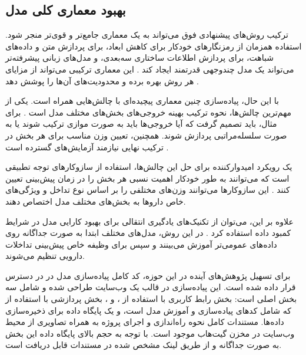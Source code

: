 \subsection{بهبود معماری کلی مدل}

ترکیب روش‌های پیشنهادی فوق می‌تواند به یک معماری جامع‌تر و قوی‌تر منجر شود. استفاده همزمان از رمزنگارهای خودکار برای کاهش ابعاد،  برای پردازش متن و داده‌های شباهت،  برای پردازش اطلاعات ساختاری سه‌بعدی، و مدل‌های زبانی پیشرفته‌تر می‌تواند یک مدل چندوجهی قدرتمند ایجاد کند \cite{ref_shi2024}. این معماری ترکیبی می‌تواند از مزایای هر روش بهره برده و محدودیت‌های آن‌ها را پوشش دهد \cite{ref_he2023}.

با این حال، پیاده‌سازی چنین معماری پیچیده‌ای با چالش‌هایی همراه است. یکی از مهم‌ترین چالش‌ها، نحوه ترکیب بهینه خروجی‌های بخش‌های مختلف مدل است \cite{ref_dai2020}. برای مثال، باید تصمیم گرفت که آیا خروجی‌ها باید به صورت موازی ترکیب شوند یا به صورت سلسله‌مراتبی پردازش شوند. همچنین، تعیین وزن مناسب برای هر بخش در ترکیب نهایی نیازمند آزمایش‌های گسترده است \cite{ref_yang2022}.

یک رویکرد امیدوارکننده برای حل این چالش‌ها، استفاده از سازوکار‌های توجه تطبیقی است که می‌توانند به طور خودکار اهمیت نسبی هر بخش را در زمان پیش‌بینی تعیین کنند \cite{ref_lin2022}. این سازوکار‌ها می‌توانند وزن‌های مختلفی را بر اساس نوع تداخل و ویژگی‌های خاص داروها به بخش‌های مختلف مدل اختصاص دهند.

علاوه بر این، می‌توان از تکنیک‌های یادگیری انتقالی برای بهبود کارایی مدل در شرایط کمبود داده استفاده کرد \cite{ref_deng2022}. در این روش، مدل‌های مختلف ابتدا به صورت جداگانه روی داده‌های عمومی‌تر آموزش می‌بینند و سپس برای وظیفه خاص پیش‌بینی تداخلات دارویی تنظیم می‌شوند.

\vspace{1cm}

برای تسهیل پژوهش‌های آینده در این حوزه، کد کامل پیاده‌سازی مدل در \cite{ref_github} در دسترس قرار داده شده است. این پیاده‌سازی در قالب یک وب‌سایت طراحی شده و شامل سه بخش اصلی است: بخش رابط کاربری با استفاده از ،  و ، بخش پردازشی با استفاده از  که شامل کدهای پیاده‌سازی و آموزش مدل است، و یک پایگاه داده  برای ذخیره‌سازی داده‌ها. مستندات کامل نحوه راه‌اندازی و اجرای پروژه به همراه تصاویری از محیط وب‌سایت در مخزن گیت‌هاب موجود است. با توجه به حجم بالای پایگاه داده این بخش به صورت جداگانه و از طریق لینک مشخص شده در مستندات قابل دریافت است.
